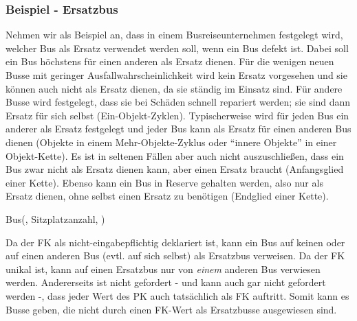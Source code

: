         \subsubsection{Beispiel - Ersatzbus}
          Nehmen wir als Beispiel an, dass in einem Busreiseunternehmen festgelegt wird, welcher Bus als Ersatz verwendet werden soll, wenn ein Bus defekt ist. Dabei soll ein Bus h\"ochstens f\"ur einen anderen als Ersatz dienen. F\"ur die wenigen neuen Busse mit geringer Ausfallwahrscheinlichkeit wird kein Ersatz vorgesehen und sie k\"onnen auch nicht als Ersatz dienen, da sie st\"andig im Einsatz sind. F\"ur andere Busse wird festgelegt, dass sie bei Sch\"aden schnell repariert werden; sie sind dann Ersatz f\"ur sich selbst (Ein-Objekt-Zyklen). Typischerweise wird f\"ur jeden Bus ein anderer als Ersatz festgelegt und jeder Bus kann als Ersatz f\"ur einen anderen Bus dienen (Objekte in einem Mehr-Objekte-Zyklus oder \enquote{innere Objekte} in einer Objekt-Kette). Es ist in seltenen F\"allen aber auch nicht auszuschlie\ss en, dass ein Bus zwar nicht als Ersatz dienen kann, aber einen Ersatz braucht (Anfangsglied einer Kette). Ebenso kann ein Bus in Reserve gehalten werden, also nur als Ersatz
dienen, ohne selbst einen Ersatz zu ben\"otigen (Endglied einer Kette).
          \begin{center}
          \end{center}
          \begin{small}
            Bus(, Sitzplatzanzahl, )
          \end{small}
\clearpage
          Da der FK  als nicht-eingabepflichtig deklariert ist, kann ein Bus auf keinen oder auf einen anderen Bus (evtl. auf sich selbst) als Ersatzbus verweisen. Da der FK unikal ist, kann auf einen Ersatzbus nur von \textit{einem} anderen Bus verwiesen werden. Andererseits ist nicht gefordert - und kann auch gar nicht gefordert werden -, dass jeder Wert des PK  auch tats\"achlich als FK auftritt. Somit kann es Busse geben, die nicht durch einen FK-Wert als Ersatzbusse ausgewiesen sind.
